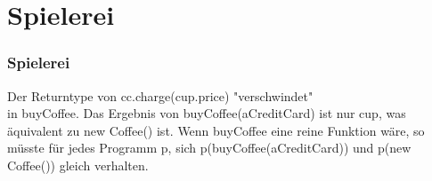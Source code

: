 \section[Section]{Spielerei}
	\begin{frame}[fragile]
	\frametitle{Spielerei}
	\begin{tcolorbox}[colback=blue!5,colframe=blue!40!black,title=RT in Beispiel1]
		Der Returntype von cc.charge(cup.price) "verschwindet"\\
		in buyCoffee. Das Ergebnis von buyCoffee(aCreditCard) ist
		nur cup, was äquivalent zu new Coffee() ist. Wenn buyCoffee eine reine 				Funktion wäre, so müsste für jedes Programm p, sich 								p(buyCoffee(aCreditCard)) und p(new Coffee()) gleich verhalten.
	\end{tcolorbox}
\end{frame}

			